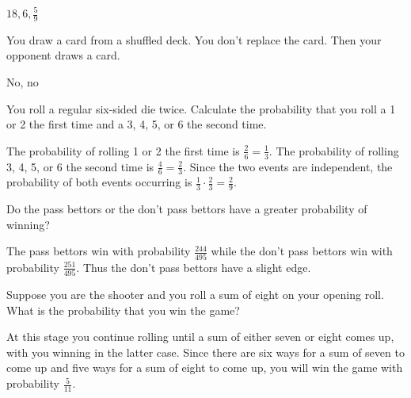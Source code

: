 \documentclass[12pt]{exam}
\begin{document}
\begin{questions}
\begin{solution} $18,6,\frac{5}{9}$\end{solution}

\question You draw a card from a shuffled deck. You don't replace
the card. Then your opponent draws a card.
\begin{solution} No, no\end{solution}

\question You roll a regular six-sided die twice. Calculate
the probability that you roll a 1 or 2 the first time and a
3, 4, 5, or 6 the second time.
\begin{solution} The probability of rolling 1 or 2 the first
time is $\frac{2}{6}=\frac{1}{3}$.
The probability of rolling 3, 4, 5, or 6 the second time
is $\frac{4}{6}=\frac{2}{3}$.
Since the two events are independent, the probability of both
events occurring is $\frac{1}{3}\cdot\frac{2}{3}=\frac{2}{9}$. \end{solution}

\question Do the pass bettors or the don't pass bettors have
a greater probability of winning?
\begin{solution} The pass bettors win with probability
$\frac{244}{495}$ while the don't pass bettors win with probability
$\frac{251}{495}$. Thus the don't pass bettors have a slight edge.
\end{solution}

\question Suppose you are the shooter and you roll 
a sum of eight on your opening
roll. What is the probability that you win the game?
\begin{solution} At this stage you continue rolling until
a sum of either seven or eight comes up, with you winning
in the latter case. Since there are six ways for a sum of
seven to come up and five ways for a sum of eight to come up,
you will win the game with probability $\frac{5}{11}$.
\end{solution}


\end{questions}
\end{document}
